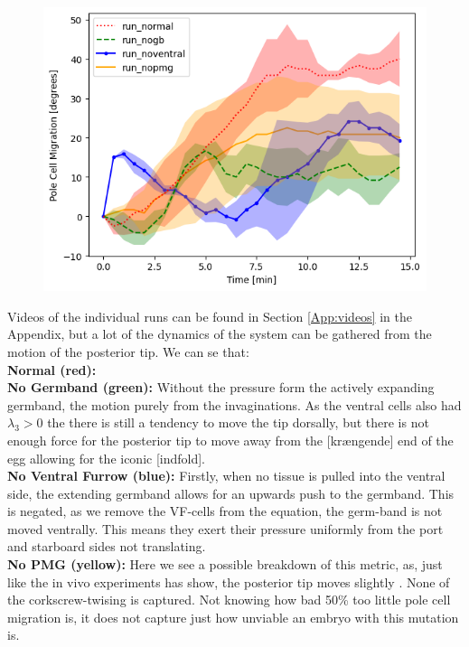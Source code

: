 \begin{figure}[H]
    \centering
    \includegraphics[width=1.\linewidth]{chapters/Results/figures/compare_PCM.png}
    \caption{}
    \label{fig:PCM-mutants}
\end{figure}

Videos of the individual runs can be found in Section \ref{App:videos} in the Appendix, but a lot of the dynamics of the system can be gathered from the motion of the posterior tip. We can se that:\\
\textbf{Normal (red):} \\
\textbf{No Germband (green):} Without the pressure form the actively expanding germband, the motion purely from the invaginations. As the ventral cells also had $\lambda_3>0$ the there is still a tendency to move the tip dorsally, but there is not enough force for the posterior tip to move away from the [krængende] end of the egg allowing for the iconic [indfold]. \\
\textbf{No Ventral Furrow (blue):} Firstly, when no tissue is pulled into the ventral side, the extending germband allows for an upwards push to the germband. This is negated, as we remove the VF-cells from the equation, the germ-band is not moved ventrally. This means they exert their pressure uniformly from the port and starboard sides not translating.\\
\textbf{No PMG (yellow):} Here we see a possible breakdown of this metric, as, just like the in vivo experiments has show, the posterior tip moves slightly . None of the corkscrew-twising is captured. Not knowing how bad  50\% too little pole cell migration is, it does not capture just how unviable an embryo with this mutation is.   \\
\\


